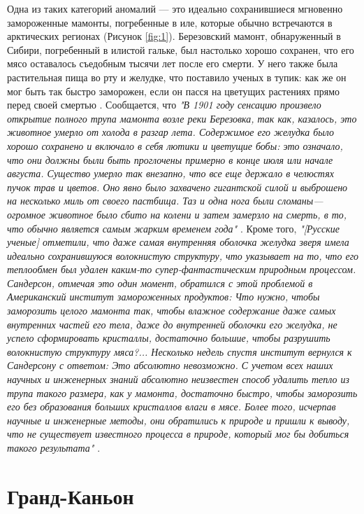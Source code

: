 \documentclass[10pt,twocolumn,letterpaper]{article}
\begin{document}
Одна из таких категорий аномалий — это идеально сохранившиеся мгновенно замороженные мамонты, погребенные в иле, которые обычно встречаются в арктических регионах (Рисунок \ref{fig:1}). Березовский мамонт, обнаруженный в Сибири, погребенный в илистой гальке, был настолько хорошо сохранен, что его мясо оставалось съедобным тысячи лет после его смерти. У него также была растительная пища во рту и желудке, что поставило ученых в тупик: как же он мог быть так быстро заморожен, если он пасся на цветущих растениях прямо перед своей смертью \cite{17}. Сообщается, что \textit{"В 1901 году сенсацию произвело открытие полного трупа мамонта возле реки Березовка, так как, казалось, это животное умерло от холода в разгар лета. Содержимое его желудка было хорошо сохранено и включало в себя лютики и цветущие бобы: это означало, что они должны были быть проглочены примерно в конце июля или начале августа. Существо умерло так внезапно, что все еще держало в челюстях пучок трав и цветов. Оно явно было захвачено гигантской силой и выброшено на несколько миль от своего пастбища. Таз и одна нога были сломаны—огромное животное было сбито на колени и затем замерзло на смерть, в то, что обычно является самым жарким временем года"} \cite{18}. Кроме того, \textit{"[Русские ученые] отметили, что даже самая внутренняя оболочка желудка зверя имела идеально сохранившуюся волокнистую структуру, что указывает на то, что его теплообмен был удален каким-то супер-фантастическим природным процессом. Сандерсон, отмечая это один момент, обратился с этой проблемой в Американский институт замороженных продуктов: Что нужно, чтобы заморозить целого мамонта так, чтобы влажное содержание даже самых внутренних частей его тела, даже до внутренней оболочки его желудка, не успело сформировать кристаллы, достаточно большие, чтобы разрушить волокнистую структуру мяса?... Несколько недель спустя институт вернулся к Сандерсону с ответом: Это абсолютно невозможно. С учетом всех наших научных и инженерных знаний абсолютно неизвестен способ удалить тепло из трупа такого размера, как у мамонта, достаточно быстро, чтобы заморозить его без образования больших кристаллов влаги в мясе. Более того, исчерпав научные и инженерные методы, они обратились к природе и пришли к выводу, что не существует известного процесса в природе, который мог бы добиться такого результата"} \cite{19}.

\section{Гранд-Каньон}
\end{document}
